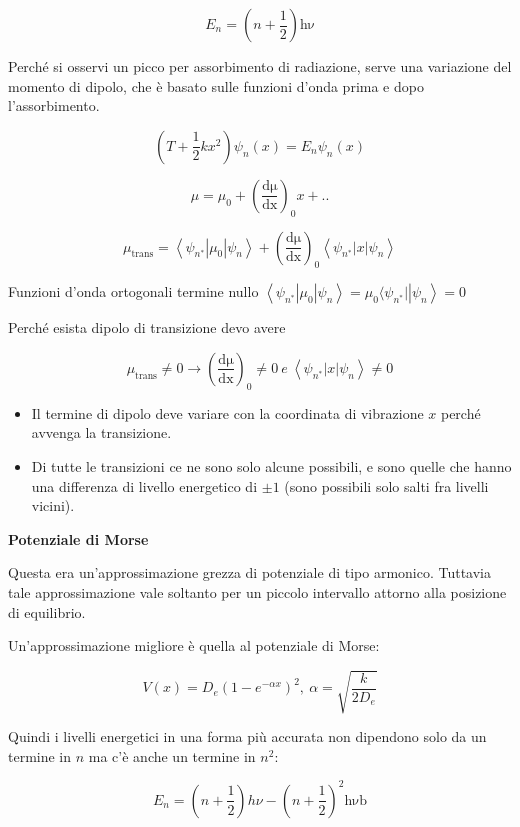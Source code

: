 \[E_{n} = \left( n + \frac{1}{2} \right)\text{hν}\]

Perché si osservi un picco per assorbimento di radiazione, serve una
variazione del momento di dipolo, che è basato sulle funzioni d'onda
prima e dopo l'assorbimento.

\[\left( T + \frac{1}{2}kx^{2} \right)\psi_{n}\left( x \right) = E_{n}\psi_{n}\left( x \right)\]

\[\mu = \mu_{0} + \left( \frac{\text{dμ}}{\text{dx}} \right)_{0}x + ..\]

\[\mu_{\text{trans}} = \left\langle \psi_{n^{*}}\left| \mu_{0} \right|\psi_{n} \right\rangle + \left( \frac{\text{dμ}}{\text{dx}} \right)_{0}\left\langle \psi_{n^{*}}\left| x \right|\psi_{n} \right\rangle\]

Funzioni d'onda ortogonali termine nullo
\(\left\langle \psi_{n^{*}}\left| \mu_{0} \right|\psi_{n} \right\rangle = \mu_{0}\langle\psi_{n^{*}}|\left| \psi_{n} \right\rangle = 0\)

Perché esista dipolo di transizione devo avere

\[\mu_{\text{trans}} \neq 0 \rightarrow \left( \frac{\text{dμ}}{\text{dx}} \right)_{0} \neq 0\ e\ \left\langle \psi_{n^{*}}\left| x \right|\psi_{n} \right\rangle \neq 0\]

\begin{itemize}
\item
  Il termine di dipolo deve variare con la coordinata di vibrazione
  \(x\) perché avvenga la transizione.
\item
  Di tutte le transizioni ce ne sono solo alcune possibili, e sono
  quelle che hanno una differenza di livello energetico di \(\pm 1\)
  (sono possibili solo salti fra livelli vicini).
\end{itemize}

\textbf{Potenziale di Morse}

Questa era un'approssimazione grezza di potenziale di tipo armonico.
Tuttavia tale approssimazione vale soltanto per un piccolo intervallo
attorno alla posizione di equilibrio.

Un'approssimazione migliore è quella al potenziale di Morse:

\[V\left( x \right) = D_{e}\left( 1 - e^{- \alpha x} \right)^{2},\ \alpha = \sqrt{\frac{k}{2D_{e}}}\]

Quindi i livelli energetici in una forma più accurata non dipendono solo
da un termine in \(n\) ma c'è anche un termine in \(n^{2}\):

\[E_{n} = \left( n + \frac{1}{2} \right)h\nu - \left( n + \frac{1}{2} \right)^{2}\text{hνb}\]

